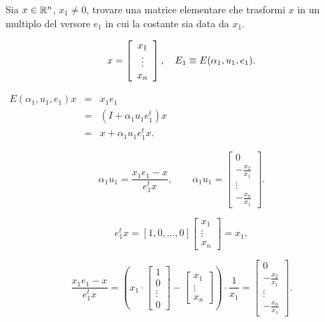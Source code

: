 \begin{ese}
Sia $x \in \mathbb{R}^n$, $x_1 \neq 0$, trovare una matrice elementare che
trasformi $x$ in un multiplo del versore $e_1$ in cui la costante sia data da
$x_1$.

\[
x = \left[ \begin{array}{c} x_{1} \\ \vdots \\ x_{n} \end{array}\right],\quad E_1 \equiv E(\alpha_1, u_1, e_1).
\]

$
\begin{array}{ccl}
E(\alpha_1, u_1, e_1)x & = & x_1e_1 \\
& = & (I + \alpha_1u_1e_1^t)x \\
& = & x + \alpha_1u_1e_1^tx.
\end{array}$

\[
\alpha_1u_1 = \frac{x_1e_1 - x}{e_1^tx}, \qquad
\alpha_1u_1 = \left[
\begin{array}{c}
0 \\
-\frac{x_2}{x_1} \\
\vdots \\
-\frac{x_n}{x_1}
\end{array}\right].
\]

\[ e_1^tx = [1, 0, \ldots, 0]\left[ \begin{array}{c}
x_{1} \\
\vdots \\
x_{n}
\end{array}\right]   = x_1, \]

\[
\frac{x_1e_1 - x}{e_1^tx} = \left(
x_{1} \cdot \left[ \begin{array}{c}
1 \\
0 \\
\vdots \\
0
\end{array}\right] - \left[ \begin{array}{c}
x_{1} \\
\vdots \\
x_n
\end{array}\right]\right) \cdot \frac{1}{x_1}= \left[
\begin{array}{c}
0 \\
-\frac{x_2}{x_1} \\
\vdots \\
-\frac{x_n}{x_1}
\end{array}\right].
\]


\end{ese}
